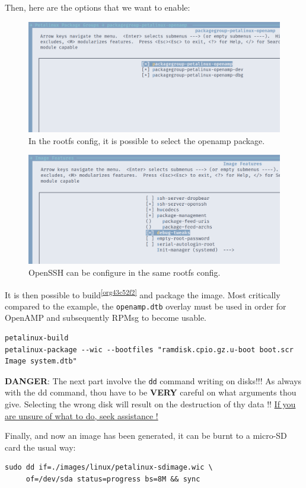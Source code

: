 \documentclass[10pt]{article}
\begin{document}
Then, here are the options that we want to enable:
\begin{figure}[htbp]
\centering
\includegraphics[width=.6\textwidth]{./img/yocto_openamp.png}
\caption{\label{fig:org96e62d2}In the rootfs config, it is possible to select the openamp package.}
\end{figure}


\begin{figure}[htbp]
\centering
\includegraphics[width=.6\textwidth]{./img/yocto_ssh.png}
\caption{\label{fig:org9ff0e5b}OpenSSH can be configure in the same rootfs config.}
\end{figure}

It is then possible to build\textsuperscript{\ref{org43c52f2}} and package the image. Most critically compared to the example,
the \texttt{openamp.dtb} overlay must be used in order for OpenAMP and subsequently RPMsg to become usable.
\begin{verbatim}
petalinux-build
petalinux-package --wic --bootfiles "ramdisk.cpio.gz.u-boot boot.scr Image system.dtb"
\end{verbatim}

\begin{tcolorbox}[colback=red!5!white,colframe=red!75!black]
\textbf{DANGER}: The next part involve the \texttt{dd} command writing on disks!!!
As always with the dd command, thou have to be \textbf{VERY} careful on what arguments
thou give. Selecting the wrong disk will result on the destruction of
thy data !!
\uline{If you are unsure of what to do, seek assistance !}
\end{tcolorbox}

Finally, and now an image has been generated, it can be burnt to a micro-SD card the usual way:
\begin{verbatim}
sudo dd if=./images/linux/petalinux-sdimage.wic \
     of=/dev/sda status=progress bs=8M && sync
\end{verbatim}
\end{document}
